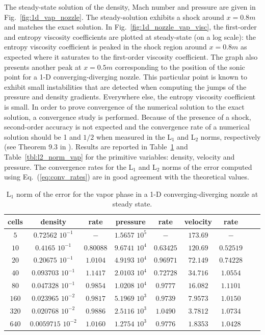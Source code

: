 \documentclass[preprint,10pt]{elsarticle}
\newcommand{\eqt}[1]{Eq.~(\ref{#1})}                     %
\newcommand{\fig}[1]{Fig.~\ref{#1}}                      %
\newcommand{\tbl}[1]{Table~\ref{#1}}                     %
\begin{document}
%
The steady-state solution of the density, Mach number and pressure are given in \fig{fig:1d_vap_nozzle}. The steady-solution exhibits a shock around $x=0.8m$ and matches the exact solution. In \fig{fig:1d_nozzle_vap_visc}, the first-order and entropy viscosity coefficients are plotted at steady-state (on a log scale): the entropy viscosity coefficient is peaked in the shock region around $x=0.8m$ as expected where it saturates to the first-order viscosity coefficient. The graph also presents another peak at $x=0.5m$  corresponding to the position of the sonic point for a 1-D converging-diverging nozzle. This particular point is known to exhibit small instabilities that are detected when computing the jumps of the pressure and density gradients. Everywhere else, the entropy  viscosity coefficient is small. In order to prove convergence of the numerical solution to the exact solution, a convergence study is performed. Because of the presence of a shock, second-order accuracy is not expected and the convergence rate of a numerical solution should be 1 and $1/2$ when measured in the L$_1$ and L$_2$ norms, respectively (see Theorem 9.3 in \cite{convergence_book}). Results are reported in \tbl{tbl:l1_norm_vap} and \tbl{tbl:l2_norm_vap} for the primitive variables: density, velocity and pressure. The convergence rates for the L$_1$ and L$_2$ norms of the error computed using \eqt{eq:conv_rates} are in good agreement with the theoretical values.
%
\begin{table}[!htbp]
\begin{center}
 \caption{\label{tbl:l1_norm_vap} L$_1$ norm of the error for the vapor phase in a 1-D converging-diverging nozzle at steady state.}
 \begin{tabular}{|c|c|c|c|c|c|c|c|c|}
 \hline
cells & density              & rate      & pressure          & rate      & velocity & rate      \\ \hline
$5$  & $0.72562$   $10^{-1}$ & $-$       & $1.5657$ $10^{5}$ & $-$       & $173.69$ & $-$       \\ \hline
$10$ & $0.4165$    $10^{-1}$ & $0.80088$ & $9.6741$ $10^{4}$ & $0.63425$ & $120.69$ & $0.52519$ \\ \hline
$20$ & $0.20675$   $10^{-1}$ & $1.0104$  & $4.9193$ $10^{4}$ & $0.96971$ & $72.149$ & $0.74228$ \\ \hline
$40$ & $0.093703$  $10^{-1}$ & $1.1417$  & $2.0103$ $10^{4}$ & $0.72728$ & $34.716$ & $1.0554$  \\ \hline
$80$ & $0.047328$  $10^{-1}$ & $0.9854$  & $1.0208$ $10^{4}$ & $0.9777$  & $16.082$ & $1.1101$  \\ \hline
$160$& $0.023965$  $10^{-2}$ & $0.9817$  & $5.1969$ $10^{3}$ & $0.9739$  & $7.9573$ & $1.0150$  \\ \hline
$320$& $0.020768$  $10^{-2}$ & $0.9886$  & $2.5116$ $10^{3}$ & $1.0490$  & $3.7812$ & $1.0734$  \\ \hline
$640$& $0.0059715$ $10^{-2}$ & $1.0160$  & $1.2754$ $10^{3}$ & $0.9776$  & $1.8353$ & $1.0428$  \\ \hline
\end{tabular}
\end{center}
\nonumber
\end{table}
\end{document}
